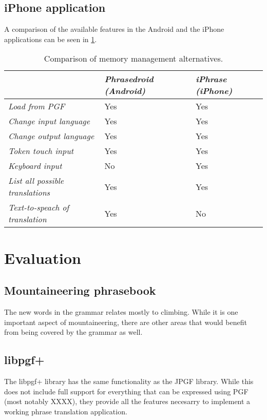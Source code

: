 \subsection{iPhone application}
A comparison of the available features in the Android and the iPhone applications can be seen in \ref{tbl:appcomparison}.
\begin{table}
\begin{center}
\begin{tabular}{|l|l|l|}
	\hline
	 & \emph{Phrasedroid (Android)} & \emph{iPhrase (iPhone)} \\ \hline
	\emph{Load from PGF} & Yes & Yes \\ \hline
	\emph{Change input language} & Yes & Yes \\ \hline
	\emph{Change output language} & Yes & Yes \\ \hline
	\emph{Token touch input} & Yes & Yes \\ \hline
	\emph{Keyboard input} & No & Yes \\ \hline
	\emph{List all possible translations} & Yes & Yes \\ \hline
	\emph{Text-to-speach of translation} & Yes & No \\ \hline
\end{tabular}
\end{center}
\caption{Comparison of memory management alternatives.}
\label{tbl:appcomparison}
\end{table}


\section{Evaluation}


\subsection{Mountaineering phrasebook}
The new words in the grammar relates mostly to climbing. While it is one important aspect of mountaineering, there are other areas that would benefit from being covered by the grammar as well.

\subsection{libpgf+}
The libpgf+ library has the same functionality as the JPGF library. While this does not include full support for everything that can be expressed using PGF (most notably XXXX), they provide all the features necesarry to implement a working phrase translation application.


